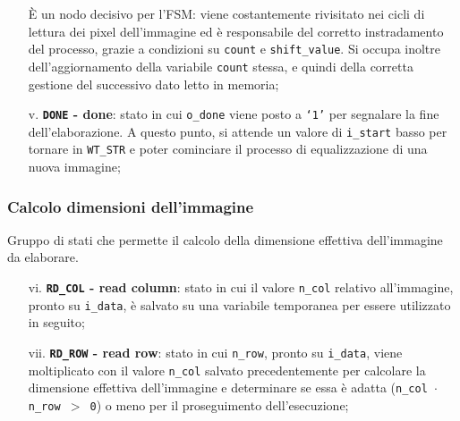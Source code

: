 \documentclass{article}
\begin{document}
\begin{itemize}
          È un nodo decisivo per l’FSM: viene costantemente rivisitato nei cicli di lettura dei pixel dell’immagine ed è responsabile del corretto instradamento del processo, grazie a condizioni su \texttt{count} e \texttt{shift\_value}. Si occupa inoltre dell’aggiornamento della variabile \texttt{count} stessa, e quindi della corretta gestione del successivo dato letto in memoria;
    \item [v.]      \textbf{\texttt{DONE} - done}: stato in cui \texttt{o\_done} viene posto a \texttt{‘1’} per segnalare la fine dell’elaborazione. A questo punto, si attende un valore di \texttt{i\_start} basso per tornare in \texttt{WT\_STR} e poter cominciare il processo di equalizzazione di una nuova immagine;
\end{itemize}

\clearpage

\subsubsection{Calcolo dimensioni dell'immagine} %
Gruppo di stati che permette il calcolo della dimensione effettiva dell’immagine da elaborare.
\begin{itemize}
    \item [vi.]     \textbf{\texttt{RD\_COL} - read column}: stato in cui il valore \texttt{n\_col} relativo all’immagine, pronto su \texttt{i\_data}, è salvato su una variabile temporanea per essere utilizzato in seguito;
    \item [vii.]    \textbf{\texttt{RD\_ROW} - read row}: stato in cui \texttt{n\_row}, pronto su \texttt{i\_data}, viene moltiplicato con il valore \texttt{n\_col} salvato precedentemente per calcolare la dimensione effettiva dell’immagine e determinare se essa è adatta (\texttt{n\_col $\cdot$ n\_row $>$ 0}) o meno per il proseguimento dell’esecuzione;
\end{itemize}
\end{document}

